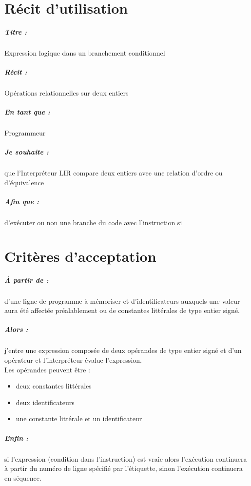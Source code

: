 \documentclass[12pt,a5paper, notitle, oneside]{report}
\begin{document}
    \chapter*{Récit d'utilisation}

    \paragraph{Titre : } Expression logique dans un branchement
    conditionnel
    \paragraph{Récit : } Opérations relationnelles sur deux entiers
    \paragraph{En tant que : } Programmeur
    \paragraph{Je souhaite : } que l'Interpréteur LIR compare deux
    entiers avec une relation d'ordre ou d'équivalence
    \paragraph{Afin que : } d'exécuter ou non une branche du code avec
    l'instruction si
    \newpage

    \chapter*{Critères d'acceptation}

    \paragraph{À partir de : } d'une ligne de programme à mémoriser et d'identificateurs auxquels une valeur aura été affectée préalablement
    ou de constantes littérales de type entier signé.

    \paragraph{Alors : } j'entre une expression composée de deux
    opérandes de type entier signé et d'un opérateur et l'interpréteur
    évalue l'expression.
    \\ Les opérandes peuvent être :
    \begin{itemize}
        \item deux constantes littérales
        \item deux identificateurs
        \item une constante littérale et un identificateur
    \end{itemize}

    \paragraph{Enfin : } si l'expression (condition dans l'instruction)
    est vraie alors l'exécution continuera à partir du numéro de ligne
    spécifié par l’étiquette, sinon l'exécution continuera en séquence.
\end{document}
